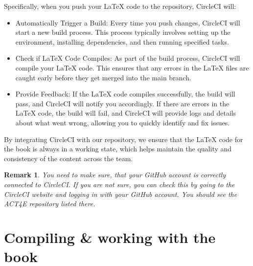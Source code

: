 \documentclass{article}
\newtheorem{remark}{Remark}
\begin{document}
Specifically, when you push your LaTeX code to the repository, CircleCI will:
\begin{itemize}
\item Automatically Trigger a Build: Every time you push changes, CircleCI will start a new build process. This process typically involves setting up the environment, installing dependencies, and then running specified tasks.

\item Check if LaTeX Code Compiles: As part of the build process, CircleCI will compile your LaTeX code. This ensures that any errors in the LaTeX files are caught early before they get merged into the main branch.

\item Provide Feedback: If the LaTeX code compiles successfully, the build will pass, and CircleCI will notify you accordingly. If there are errors in the LaTeX code, the build will fail, and CircleCI will provide logs and details about what went wrong, allowing you to quickly identify and fix issues.
\end{itemize}

By integrating CircleCI with our repository, we ensure that the LaTeX code for the book is always in a working state, which helps maintain the quality and consistency of the content across the team.

\begin{remark}
    You need to make sure, that your GitHub account is correctly connected to CircleCI. If you are not sure, you can check this by going to the CircleCI website and logging in with your GitHub account. You should see the ACT4E repository listed there.
\end{remark}

\section{Compiling \& working with the book}
\end{document}
